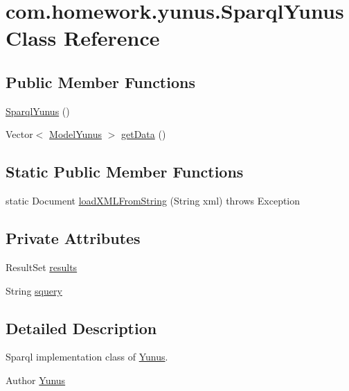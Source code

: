 \hypertarget{classcom_1_1homework_1_1yunus_1_1_sparql_yunus}{}\section{com.\+homework.\+yunus.\+Sparql\+Yunus Class Reference}
\label{classcom_1_1homework_1_1yunus_1_1_sparql_yunus}
\subsection*{Public Member Functions}
\begin{DoxyCompactItemize}
\item 
\hyperlink{classcom_1_1homework_1_1yunus_1_1_sparql_yunus_ab4b87437911dc8b0287beb1376117064}{Sparql\+Yunus} ()
\item 
Vector$<$ \hyperlink{classcom_1_1homework_1_1yunus_1_1_model_yunus}{Model\+Yunus} $>$ \hyperlink{classcom_1_1homework_1_1yunus_1_1_sparql_yunus_a94b0fe53839f68e0001f3e5f414ec46a}{get\+Data} ()
\end{DoxyCompactItemize}
\subsection*{Static Public Member Functions}
\begin{DoxyCompactItemize}
\item 
static Document \hyperlink{classcom_1_1homework_1_1yunus_1_1_sparql_yunus_aba69854d3e0f548f888fb4291f2f9497}{load\+X\+M\+L\+From\+String} (String xml)  throws Exception 	
\end{DoxyCompactItemize}
\subsection*{Private Attributes}
\begin{DoxyCompactItemize}
\item 
Result\+Set \hyperlink{classcom_1_1homework_1_1yunus_1_1_sparql_yunus_a8501e4ed305ac8950893aa8b796a52ad}{results}
\item 
String \hyperlink{classcom_1_1homework_1_1yunus_1_1_sparql_yunus_ab6cecc25b9305e7ea928f09f380e6137}{squery}
\end{DoxyCompactItemize}


\subsection{Detailed Description}
Sparql implementation class of \hyperlink{classcom_1_1homework_1_1yunus_1_1_yunus}{Yunus}. \begin{DoxyAuthor}{Author}
\hyperlink{classcom_1_1homework_1_1yunus_1_1_yunus}{Yunus} 
\end{DoxyAuthor}


